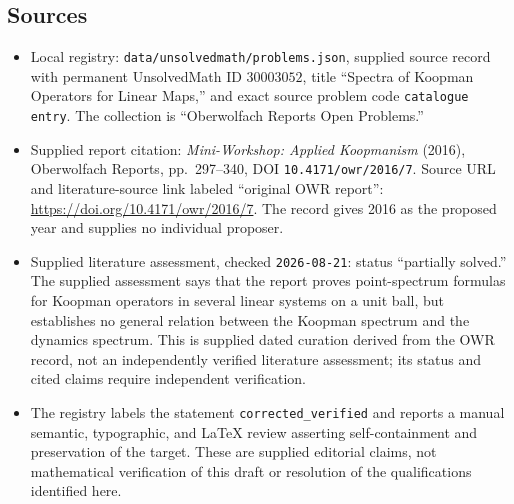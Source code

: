 \documentclass[11pt]{article}
\begin{document}
\subsection{Sources}
\begin{itemize}
\item Local registry: \texttt{data/unsolvedmath/problems.json}, supplied source record with permanent UnsolvedMath ID \(30003052\), title ``Spectra of Koopman Operators for Linear Maps,'' and exact source problem code \texttt{catalogue entry}. The collection is ``Oberwolfach Reports Open Problems.''
\item Supplied report citation: \emph{Mini-Workshop: Applied Koopmanism} (2016), Oberwolfach Reports, pp.\ 297--340, DOI \texttt{10.4171/owr/2016/7}. Source URL and literature-source link labeled ``original OWR report'': \url{https://doi.org/10.4171/owr/2016/7}. The record gives 2016 as the proposed year and supplies no individual proposer.
\item Supplied literature assessment, checked \texttt{2026-08-21}: status ``partially solved.'' The supplied assessment says that the report proves point-spectrum formulas for Koopman operators in several linear systems on a unit ball, but establishes no general relation between the Koopman spectrum and the dynamics spectrum. This is supplied dated curation derived from the OWR record, not an independently verified literature assessment; its status and cited claims require independent verification.
\item The registry labels the statement \texttt{corrected\_verified} and reports a manual semantic, typographic, and LaTeX review asserting self-containment and preservation of the target. These are supplied editorial claims, not mathematical verification of this draft or resolution of the qualifications identified here.
\end{itemize}
\end{document}
